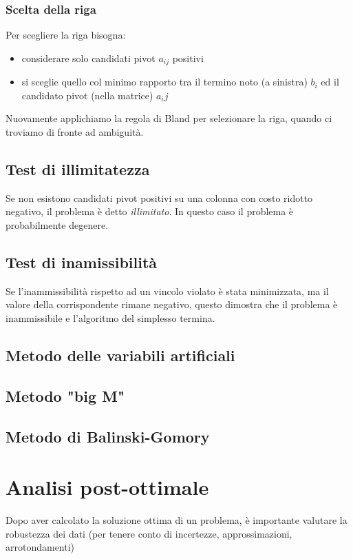 \documentclass[11pt, oneside]{article}   	%
\begin{document}
\subsubsection{Scelta della riga}
Per scegliere la riga bisogna:
\begin{itemize}
\item considerare solo candidati pivot $a_{ij}$ positivi
\item si sceglie quello col minimo rapporto tra il termino noto (a sinistra) $b_i$ ed il candidato pivot (nella matrice) $a_ij$ 
\end{itemize}
Nuovamente applichiamo la regola di Bland per selezionare la riga, quando ci troviamo di fronte ad ambiguità.

\subsection{Test di illimitatezza}
Se non esistono candidati pivot positivi su una colonna con costo ridotto negativo, il problema è detto \emph{illimitato}. In questo caso il problema è probabilmente degenere.

\subsection{Test di inamissibilità}
Se l'inammissibilità rispetto ad un vincolo violato è stata minimizzata, ma il valore della corrispondente rimane negativo, questo dimostra che il problema è inammissibile e l'algoritmo del simplesso termina.

\subsection{Metodo delle variabili artificiali}

\subsection{Metodo "big M"}
\subsection{Metodo di Balinski-Gomory}

\section{Analisi post-ottimale}
Dopo aver calcolato la soluzione ottima di un problema, è importante valutare la robustezza dei dati (per tenere conto di incertezze, approssimazioni, arrotondamenti)
\end{document}
